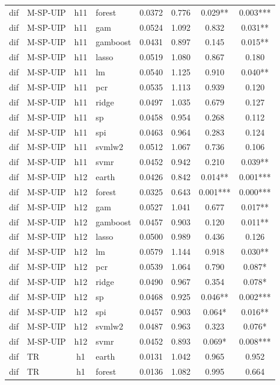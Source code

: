 \begin{ThreePartTable}
\begin{longtable}[t]{llclcccc}
dif & M-SP-UIP & h11 & forest & 0.0372 & 0.776 & 0.029** & 0.003***\\
dif & M-SP-UIP & h11 & gam & 0.0524 & 1.092 & 0.832 & 0.031**\\
dif & M-SP-UIP & h11 & gamboost & 0.0431 & 0.897 & 0.145 & 0.015**\\
dif & M-SP-UIP & h11 & lasso & 0.0519 & 1.080 & 0.867 & 0.180\\
dif & M-SP-UIP & h11 & lm & 0.0540 & 1.125 & 0.910 & 0.040**\\
dif & M-SP-UIP & h11 & pcr & 0.0535 & 1.113 & 0.939 & 0.120\\
dif & M-SP-UIP & h11 & ridge & 0.0497 & 1.035 & 0.679 & 0.127\\
dif & M-SP-UIP & h11 & sp & 0.0458 & 0.954 & 0.268 & 0.112\\
dif & M-SP-UIP & h11 & spi & 0.0463 & 0.964 & 0.283 & 0.124\\
dif & M-SP-UIP & h11 & svmlw2 & 0.0512 & 1.067 & 0.736 & 0.106\\
dif & M-SP-UIP & h11 & svmr & 0.0452 & 0.942 & 0.210 & 0.039**\\
\addlinespace
dif & M-SP-UIP & h12 & earth & 0.0426 & 0.842 & 0.014** & 0.001***\\
dif & M-SP-UIP & h12 & forest & 0.0325 & 0.643 & 0.001*** & 0.000***\\
dif & M-SP-UIP & h12 & gam & 0.0527 & 1.041 & 0.677 & 0.017**\\
dif & M-SP-UIP & h12 & gamboost & 0.0457 & 0.903 & 0.120 & 0.011**\\
dif & M-SP-UIP & h12 & lasso & 0.0500 & 0.989 & 0.436 & 0.126\\
dif & M-SP-UIP & h12 & lm & 0.0579 & 1.144 & 0.918 & 0.030**\\
dif & M-SP-UIP & h12 & pcr & 0.0539 & 1.064 & 0.790 & 0.087*\\
dif & M-SP-UIP & h12 & ridge & 0.0490 & 0.967 & 0.354 & 0.078*\\
dif & M-SP-UIP & h12 & sp & 0.0468 & 0.925 & 0.046** & 0.002***\\
dif & M-SP-UIP & h12 & spi & 0.0457 & 0.903 & 0.064* & 0.016**\\
dif & M-SP-UIP & h12 & svmlw2 & 0.0487 & 0.963 & 0.323 & 0.076*\\
dif & M-SP-UIP & h12 & svmr & 0.0452 & 0.893 & 0.069* & 0.008***\\
\addlinespace
dif & TR & h1 & earth & 0.0131 & 1.042 & 0.965 & 0.952\\
dif & TR & h1 & forest & 0.0136 & 1.082 & 0.995 & 0.664\\

\end{longtable}
\end{ThreePartTable}
